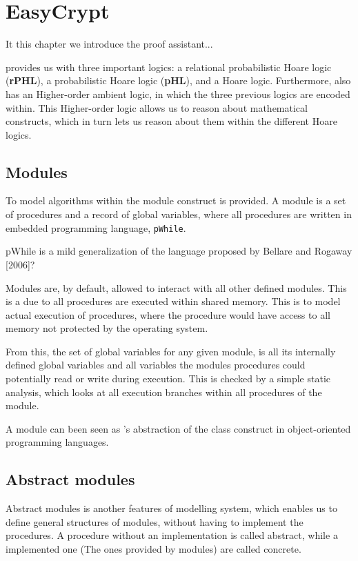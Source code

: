 \chapter{EasyCrypt}
\label{ch:EasyCrypt}

It this chapter we introduce the \easycrypt proof assistant...

\easycrypt provides us with three important logics: a relational probabilistic
Hoare logic (\textbf{rPHL}), a probabilistic Hoare logic (\textbf{pHL}), and a
Hoare logic.
Furthermore, \easycrypt also has an Higher-order ambient logic, in which the three
previous logics are encoded within. This Higher-order logic allows us to reason
about mathematical constructs, which in turn lets us reason about them within
the different Hoare logics.

\section{Modules}
\label{sec:ec_modules}
To model algorithms within \easycrypt the module construct is provided.
A module is a set of procedures and a record of global variables, where all
procedures are written in \easycrypt embedded programming language, \texttt{pWhile}.
\begin{draft}
pWhile is a mild generalization of the language proposed by Bellare and Rogaway [2006]?
\end{draft}

Modules are, by default, allowed to interact with all other defined modules.
This is a due to all procedures are executed within shared memory. This is to
model actual execution of procedures, where the procedure would have access to
all memory not protected by the operating system.

From this, the set of global variables for any given module, is all its
internally defined global variables and all variables the modules procedures
could potentially read or write during execution. This is checked by a simple
static analysis, which looks at all execution branches within all procedures of the module.

A module can been seen as \easycrypt's abstraction of the class construct
in object-oriented programming languages.


\section{Abstract modules}
\label{sec:ec_abs_modules}
Abstract modules is another features of \easycrypt modelling system, which
enables us to define general structures of modules, without having to implement
the procedures. A procedure without an implementation is called abstract, while
a implemented one (The ones provided by modules) are called concrete.

